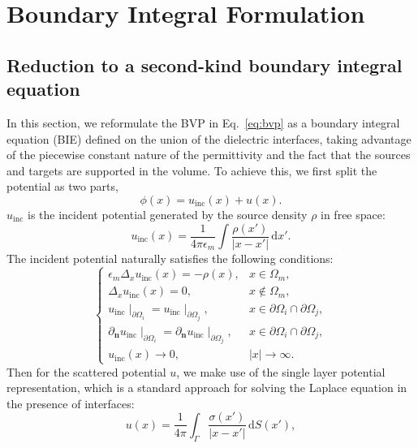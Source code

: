 \documentclass[preprint,12pt]{elsarticle}
\newcommand{\V}[1]{\boldsymbol{#1}}
\newcommand{\abs}[1]{\left|#1\right|}
\begin{document}
\section{Boundary Integral Formulation}\label{sec:bie}

\subsection{Reduction to a second-kind boundary integral equation}\label{sec:bie_derivation}

In this section, we reformulate the BVP in Eq.~\eqref{eq:bvp} as a boundary integral equation (BIE) defined on the union of the dielectric interfaces, taking advantage of the piecewise constant nature of the permittivity and the fact that the sources and targets are supported in the volume.
To achieve this, we first split the potential as two parts,
\begin{equation}
    \phi(x) = u_{\text{inc}}(x) + u(x).
\end{equation}
$u_{\text{inc}}$ is the incident potential generated by the source density $\rho$ in free space:
\begin{equation}
    u_{\text{inc}}(x) = \frac{1}{4\pi\epsilon_m}
        \int \frac{\rho(x')}{\abs{x-x'}}\, \mathrm{d}x'.
\end{equation}
The incident potential naturally satisfies the following conditions:
\begin{equation}
    \begin{cases}
        \epsilon_m \Delta_x u_{\text{inc}}(x) = -\rho(x), & x \in \Omega_m,\\
        \Delta_x u_{\text{inc}}(x) = 0, & x \notin \Omega_m,\\
        u_{\text{inc}}\mid_{\partial \Omega_i} = u_{\text{inc}}\mid_{\partial \Omega_j}, &
            x \in \partial\Omega_i \cap \partial\Omega_j,\\
        \partial_{\V n} u_{\text{inc}}\mid_{\partial \Omega_i}
            = \partial_{\V n} u_{\text{inc}}\mid_{\partial \Omega_j}, &
            x \in \partial\Omega_i \cap \partial\Omega_j,\\
        u_{\text{inc}}(x) \to 0, & \abs{x} \to \infty.
    \end{cases}
\end{equation}
Then for the scattered potential $u$, we make use of the single layer potential representation, which is a standard approach for solving the Laplace equation in the presence of interfaces:
\begin{equation}
    u(x) = \frac{1}{4\pi}\int_\Gamma \frac{\sigma(x')}{\abs{x-x'}}\, \mathrm{d}S(x'),
\end{equation}
\end{document}
